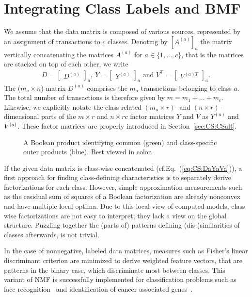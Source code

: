 \section{Integrating Class Labels and BMF}\label{sec:CS:IntegrateLabels}
We assume that the data matrix is composed of various sources, represented by an assignment of transactions to $c$ classes. Denoting by $[A^{(a)}]_a$ the matrix vertically concatenating the matrices $A^{(a)}$ for $a\in\{1,\ldots,c\}$, that is the matrices are stacked on top of each other, we write
\begin{align}\label{eq:CS:DaYaVa}
D=\begin{bmatrix}
D^{(a)}
\end{bmatrix}_a,\
Y=\begin{bmatrix}
Y^{(a)}
\end{bmatrix}_a \text{ and }
V^\top =\begin{bmatrix}
V^{(a)T}
\end{bmatrix}_a.
\end{align}
The ($m_a\times n$)-matrix $D^{(a)}$ comprises the $m_a$ transactions belonging to class $a$. The total number of transactions is therefore given by $m=m_1+\ldots+m_c$. Likewise, we explicitly notate the class-related $(m_a\times r)$- and $(n\times r)$-dimensional parts of the $m\times r$ and $n\times rc$ factor matrices $Y$ and $V$ as $Y^{(a)}$ and $V^{(a)}$. These factor matrices are properly introduced in Section~\ref{sec:CS:CSalt}.
\begin{figure}[!t]
\centering

\caption{A Boolean product identifying common (green) and class-specific outer products (blue). Best viewed in color.}
\label{fig:CS:usageJSMF}
\end{figure}
If the given data matrix is class-wise concatenated (cf.\@ Eq.~(\ref{eq:CS:DaYaVa})), a first approach for finding class-defining characteristics is to separately derive factorizations for each class. However, simple approximation measurements such as the residual sum of squares of a Boolean factorization are already nonconvex and have multiple local optima.
Due to this local view of computed models, class-wise factorizations are not easy to interpret; they lack a view on the global structure. Puzzling together the (parts of) patterns defining (dis-)similarities of classes afterwards, is not trivial.

In the case of nonnegative, labeled data matrices, measures such as Fisher's linear discriminant criterion are minimized to derive weighted feature vectors, that are patterns in the binary case, which discriminate most between classes. This variant of NMF is successfully implemented for classification problems such as face recognition~\citep{nikitidis2014projected} and identification of cancer-associated genes~\citep{odibat2014efficient}.

